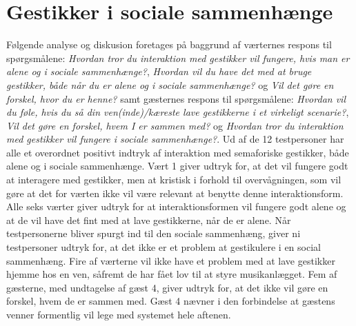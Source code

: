 \section{Gestikker i sociale sammenhænge}
\label{TestresultaterSocialAcceptSocial}
%
Følgende analyse og diskusion foretages på baggrund af værternes respons til spørgsmålene: \textit{Hvordan tror du interaktion med gestikker vil fungere, hvis man er alene og i sociale sammenhænge?}, \textit{Hvordan vil du have det med at bruge gestikker, både når du er alene og i sociale sammenhænge?} og \textit{Vil det gøre en forskel, hvor du er henne?} samt gæsternes respons til spørgsmålene: \textit{Hvordan vil du føle, hvis du så din ven(inde)/kæreste lave gestikkerne i et virkeligt scenarie?}, \textit{Vil det gøre en forskel, hvem I er sammen med?} og \textit{Hvordan tror du interaktion med gestikker vil fungere i sociale sammenhænge?}. \blankline
%
Ud af de 12 testpersoner har alle et overordnet positivt indtryk af interaktion med semaforiske gestikker, både alene og i sociale sammenhænge. Vært 1 giver udtryk for, at det vil fungere godt at interagere med gestikker, men at kristisk i forhold til overvågningen, som vil gøre at det for værten ikke vil være relevant at benytte denne interaktionsform. Alle seks værter giver udtryk for at interaktionsformen vil fungere godt alene og at de vil have det fint med at lave gestikkerne, når de er alene. Når testpersonerne bliver spurgt ind til den sociale sammenhæng, giver ni testpersoner udtryk for, at det ikke er et problem at gestikulere i en social sammenhæng. Fire af værterne vil ikke have et problem med at lave gestikker hjemme hos en ven, såfremt de har fået lov til at styre musikanlægget. Fem af gæsterne, med undtagelse af gæst 4, giver udtryk for, at det ikke vil gøre en forskel, hvem de er sammen med. Gæst 4 nævner i den forbindelse at gæstens venner formentlig vil lege med systemet hele aftenen. 

